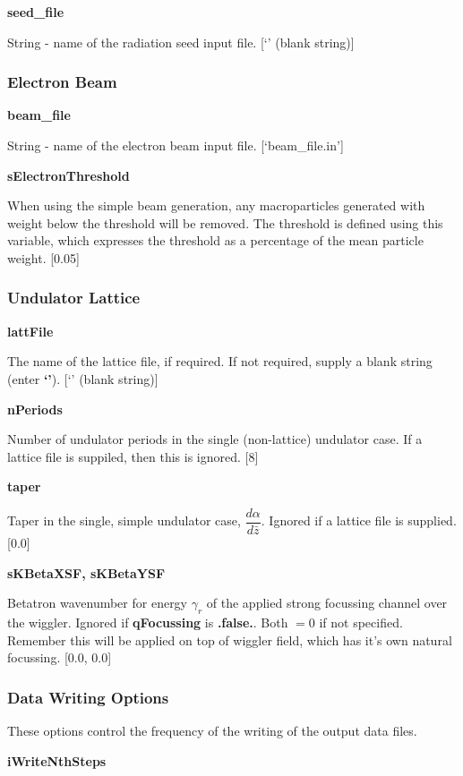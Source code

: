 \documentclass[12pt]{article}%
\begin{document}
{\bf seed\_file}

String - name of the radiation seed input file. [`' (blank string)]

\subsubsection{Electron Beam}


{\bf beam\_file}

String - name of the electron beam input file. [`beam\_file.in']

{\bf sElectronThreshold}

When using the simple beam generation, any macroparticles generated with weight below the threshold will be removed. The threshold is defined using this variable, which expresses the threshold as a percentage of the mean particle weight. [0.05]


\subsubsection{Undulator Lattice}

{\bf lattFile}

The name of the lattice file, if required. If not required, supply a blank string (enter {\bf `'}). [`' (blank string)]

{\bf nPeriods}

Number of undulator periods in the single (non-lattice) undulator case. If a lattice file is suppiled, then this is ignored. [8]

{\bf taper}

Taper in the single, simple undulator case, $\dfrac{d\alpha}{d \bar{z}}$. Ignored if a lattice file is supplied. [$0.0$]

{\bf sKBetaXSF, sKBetaYSF}

Betatron wavenumber for energy $\gamma_r$ of the applied strong focussing channel over the wiggler. Ignored if {\bf qFocussing} is {\bf .false.}. Both $=0$ if not specified. Remember this will be applied on top of wiggler field, which has it's own natural focussing. [0.0, 0.0]

\subsubsection{Data Writing Options}

These options control the frequency of the writing of the output data files.

{\bf iWriteNthSteps}
\end{document}
